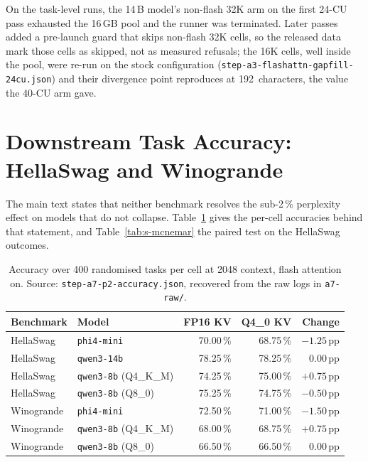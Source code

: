 \documentclass[11pt,a4paper]{article}
\begin{document}
On the task-level runs, the 14\,B model's non-flash 32K arm on the
first 24-CU pass exhausted the 16\,GB pool and the runner was
terminated.  Later passes added a pre-launch guard that skips
non-flash 32K cells, so the released data mark those cells as skipped,
not as measured refusals; the 16K cells, well inside the pool, were
re-run on the stock configuration
(\texttt{step-a3-flashattn-gapfill-24cu.json}) and their divergence
point reproduces at 192~characters, the value the 40-CU arm gave.

\section{Downstream Task Accuracy: HellaSwag and Winogrande}

The main text states that neither benchmark resolves the sub-2\,\%
perplexity effect on models that do not collapse.  Table~\ref{tab:s-tasks}
gives the per-cell accuracies behind that statement, and
Table~\ref{tab:s-mcnemar} the paired test on the HellaSwag outcomes.

\begin{table}[h]
\centering\small
\caption{Accuracy over 400 randomised tasks per cell at 2048 context,
flash attention on.  Source: \texttt{step-a7-p2-accuracy.json},
recovered from the raw logs in \texttt{a7-raw/}.}
\label{tab:s-tasks}
\begin{tabular}{@{}llrrr@{}}
\toprule
\textbf{Benchmark} & \textbf{Model} & \textbf{FP16 KV} & \textbf{Q4\_0 KV} & \textbf{Change} \\
\midrule
HellaSwag   & \texttt{phi4-mini}     & 70.00\,\% & 68.75\,\% & $-1.25$\,pp \\
HellaSwag   & \texttt{qwen3-14b}     & 78.25\,\% & 78.25\,\% & $0.00$\,pp \\
HellaSwag   & \texttt{qwen3-8b} (Q4\_K\_M) & 74.25\,\% & 75.00\,\% & $+0.75$\,pp \\
HellaSwag   & \texttt{qwen3-8b} (Q8\_0)    & 75.25\,\% & 74.75\,\% & $-0.50$\,pp \\
\midrule
Winogrande  & \texttt{phi4-mini}     & 72.50\,\% & 71.00\,\% & $-1.50$\,pp \\
Winogrande  & \texttt{qwen3-8b} (Q4\_K\_M) & 68.00\,\% & 68.75\,\% & $+0.75$\,pp \\
Winogrande  & \texttt{qwen3-8b} (Q8\_0)    & 66.50\,\% & 66.50\,\% & $0.00$\,pp \\
\bottomrule
\end{tabular}
\end{table}
\end{document}

